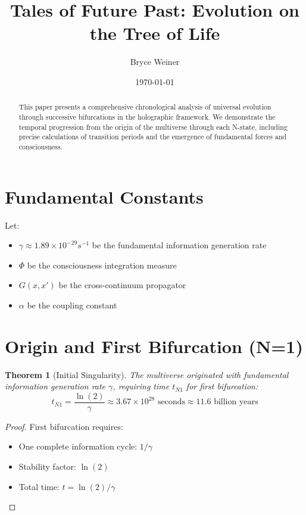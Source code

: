 \documentclass{article}
\title{Tales of Future Past: Evolution on the Tree of Life}
\author{Bryce Weiner}
\date{\today}
\newtheorem{theorem}{Theorem}
\begin{document}
\maketitle

\begin{abstract}
This paper presents a comprehensive chronological analysis of universal evolution through successive bifurcations in the holographic framework. We demonstrate the temporal progression from the origin of the multiverse through each N-state, including precise calculations of transition periods and the emergence of fundamental forces and consciousness.
\end{abstract}

\section{Fundamental Constants}

Let:
\begin{itemize}
\item $\gamma \approx 1.89 \times 10^{-29} s^{-1}$ be the fundamental information generation rate
\item $\Phi$ be the consciousness integration measure
\item $G(x,x')$ be the cross-continuum propagator
\item $\alpha$ be the coupling constant
\end{itemize}

\section{Origin and First Bifurcation (N=1)}

\begin{theorem}[Initial Singularity]
The multiverse originated with fundamental information generation rate $\gamma$, requiring time $t_{N1}$ for first bifurcation:
\[t_{N1} = \frac{\ln(2)}{\gamma} \approx 3.67 \times 10^{28} \text{ seconds} \approx 11.6 \text{ billion years}\]
\end{theorem}

\begin{proof}
First bifurcation requires:
\begin{itemize}
\item One complete information cycle: $1/\gamma$
\item Stability factor: $\ln(2)$
\item Total time: $t = \ln(2)/\gamma$
\end{itemize}
\end{proof}
\end{document}
